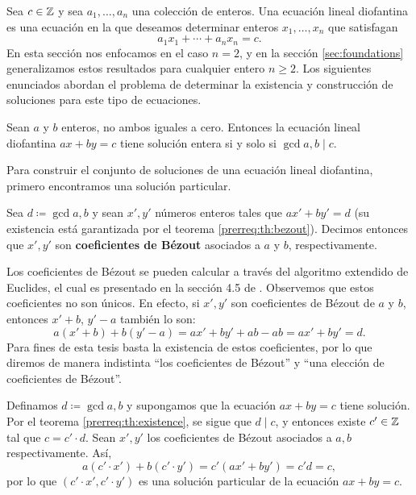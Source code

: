 \noindent
Sea $c \in \mathbb{Z}$ y sea $a_1, \ldots, a_n$ una colección de enteros. Una ecuación
lineal diofantina es una ecuación en la que deseamos determinar enteros $x_1,
\ldots, x_n$ que satisfagan
\begin{equation*}
	a_1x_1 + \cdots + a_nx_n = c.
\end{equation*}
En esta sección nos enfocamos en el caso $n = 2$, y en la sección \ref{sec:foundations}
generalizamos estos resultados para cualquier entero $n \geq 2$. Los siguientes enunciados abordan
el problema de determinar la existencia y construcción de soluciones para este tipo de ecuaciones.
\begin{theorem}[Existencia]
	\label{prerreq:th:existence}
	Sean $a$ y $b$ enteros, no ambos iguales a cero. Entonces la ecuación lineal diofantina $ax + by
	= c$ tiene solución entera si y solo si $\gcd{a, b} \mid c$.
\end{theorem}
Para construir el conjunto de soluciones de una ecuación lineal diofantina, primero encontramos  una
solución particular.
\begin{definition}
	\label{prerreq:def:bezout}
	Sea $d \coloneq \gcd{a, b}$ y sean $x', y'$ números enteros tales que $ax' + by' = d$ (su
	existencia está garantizada por el teorema \ref{prerreq:th:bezout}). Decimos entonces que $x',
	y'$ son \textbf{coeficientes de Bézout} asociados a
	$a$ y $b$, respectivamente.
\end{definition}
Los coeficientes de Bézout se pueden calcular a través del algoritmo extendido
de Euclides, el cual es presentado en la sección 4.5 de \cite{knuth}. Observemos que estos coeficientes no son únicos. En efecto, si
$x', y'$ son coeficientes de Bézout de $a$ y $b$, entonces $x' + b$, $y' - a$
también lo son:
\begin{equation*}
	a(x' + b) + b(y' - a) = ax' + by' + ab - ab = ax' + by' = d.
\end{equation*}
Para fines de esta tesis basta la existencia de estos coeficientes, por lo que diremos de manera
indistinta ``los coeficientes de Bézout'' y ``una elección de coeficientes de Bézout''.

Definamos $d \coloneq \gcd{a, b}$ y supongamos que la ecuación $ax + by = c$ tiene solución.
Por el teorema \ref{prerreq:th:existence}, se sigue que $d \mid c$, y entonces existe $c' \in \mathbb{Z}$
tal que $c = c' \cdot d$. Sean $x', y'$ los coeficientes de Bézout asociados a $a, b$
respectivamente. Así,
\begin{equation*}
	a(c' \cdot x') + b(c' \cdot y') = c'(ax' + by') = c'd = c,
\end{equation*}
por lo que $(c' \cdot x', c' \cdot y')$ es una solución particular de la ecuación $ax + by = c$.

